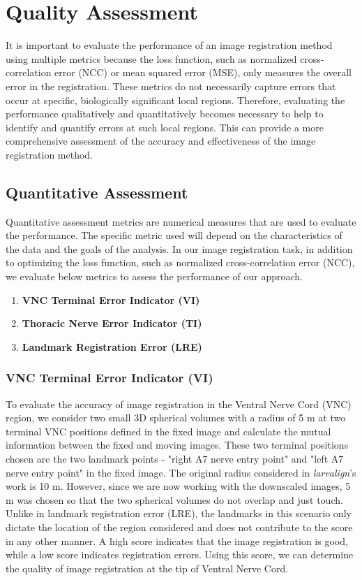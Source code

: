 \documentclass{book}
\begin{document}
	\section{Quality Assessment}\label{sec:quality}
	It is important to evaluate the performance of an image registration method using multiple metrics because the loss function, such as normalized cross-correlation error (NCC) or mean squared error (MSE), only measures the overall error in the registration. These metrics do not necessarily capture errors that occur at specific, biologically significant local regions. Therefore, evaluating the performance qualitatively and quantitatively becomes necessary to help to identify and quantify errors at such local regions. This can provide a more comprehensive assessment of the accuracy and effectiveness of the image registration method.
	
	\subsection{Quantitative Assessment} \label{subsec:quantitative}
	Quantitative assessment metrics are numerical measures that are used to evaluate the performance. The specific metric used will depend on the characteristics of the data and the goals of the analysis. In our image registration task, in addition to optimizing the loss function, such as normalized cross-correlation error (NCC), we  evaluate below metrics to assess the performance of our approach.
	\begin{enumerate}
		\item \textbf{VNC Terminal Error Indicator (VI)}
		\item \textbf{Thoracic Nerve Error Indicator (TI)}
		\item \textbf{Landmark Registration Error (LRE)}
	\end{enumerate}

	\subsubsection{VNC Terminal Error Indicator (VI)} \label{subsubsec:vi}
	To evaluate the accuracy of image registration in the Ventral Nerve Cord (VNC) region, we consider two small 3D spherical volumes with a radius of 5 \textmu m at two terminal VNC positions defined in the fixed image and calculate the mutual information between the fixed and moving images. These two terminal positions chosen are the two landmark points - "right A7 nerve entry point" and "left A7 nerve entry point" in the fixed image. The original radius considered in \textit{larvalign}'s work \cite{larvalign} is 10 \textmu m. However, since we are now working with the downscaled images, 5 \textmu m was chosen so that the two spherical volumes do not overlap and just touch. Unlike in landmark registration error (LRE), the landmarks in this scenario only dictate the location of the region considered and does not contribute to the score in any other manner.	
	A high score indicates that the image registration is good, while a low score indicates registration errors. Using this score, we can determine the quality of image registration at the tip of Ventral Nerve Cord.
	
\end{document}
